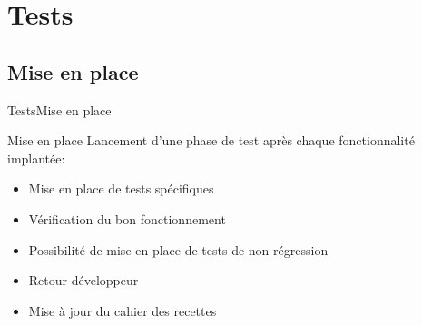 \section{Tests}

   \subsection{Mise en place}
      \begin{frame}{Tests}{Mise en place}
        \begin{block}{Mise en place}
          Lancement d'une phase de test après chaque fonctionnalité implantée:
          \begin{itemize}
            \item<1-> Mise en place de tests spécifiques
            \item<2-> Vérification du bon fonctionnement
            \item<3-> Possibilité de mise en place de tests de non-régression
            \item<4-> Retour développeur
            \item<5-> Mise à jour du cahier des recettes
          \end{itemize}
        \end{block}
      \end{frame}
